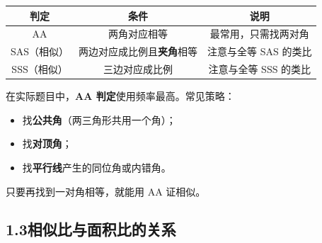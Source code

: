 \documentclass[12pt, a4paper]{ctexart}
\begin{document}
\begin{knowledgebox}[相似三角形的三种判定方法]
\begin{center}
\renewcommand{\arraystretch}{1.5}
\begin{tabular}{|c|c|c|}
\hline
\textbf{判定} & \textbf{条件} & \textbf{说明} \\
\hline
AA & 两角对应相等 & 最常用，只需找两对角 \\
\hline
SAS（相似） & 两边对应成比例且\textbf{夹角}相等 & 注意与全等 SAS 的类比 \\
\hline
SSS（相似） & 三边对应成比例 & 注意与全等 SSS 的类比 \\
\hline
\end{tabular}
\end{center}

\begin{tipbox}[规律总结]
在实际题目中，\textbf{AA 判定}使用频率最高。常见策略：
\begin{itemize}[nosep]
  \item 找\textbf{公共角}（两三角形共用一个角）；
  \item 找\textbf{对顶角}；
  \item 找\textbf{平行线}产生的同位角或内错角。
\end{itemize}
只要再找到一对角相等，就能用 AA 证相似。
\end{tipbox}
\end{knowledgebox}

\subsection*{1.3\quad 相似比与面积比的关系}
\end{document}
